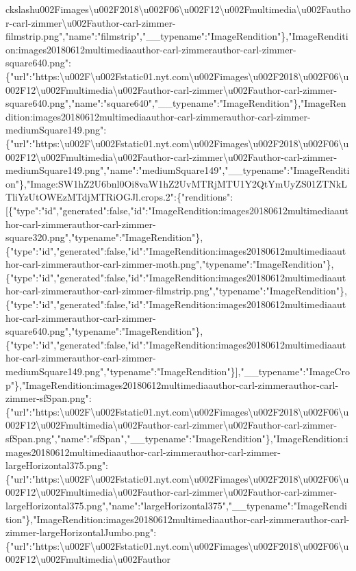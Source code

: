ckslash{}u002Fimages\textbackslash{}u002F2018\textbackslash{}u002F06\textbackslash{}u002F12\textbackslash{}u002Fmultimedia\textbackslash{}u002Fauthor-carl-zimmer\textbackslash{}u002Fauthor-carl-zimmer-filmstrip.png","name":"filmstrip","\_\_typename":"ImageRendition"\},"ImageRendition:images20180612multimediaauthor-carl-zimmerauthor-carl-zimmer-square640.png":\{"url":"https:\textbackslash{}u002F\textbackslash{}u002Fstatic01.nyt.com\textbackslash{}u002Fimages\textbackslash{}u002F2018\textbackslash{}u002F06\textbackslash{}u002F12\textbackslash{}u002Fmultimedia\textbackslash{}u002Fauthor-carl-zimmer\textbackslash{}u002Fauthor-carl-zimmer-square640.png","name":"square640","\_\_typename":"ImageRendition"\},"ImageRendition:images20180612multimediaauthor-carl-zimmerauthor-carl-zimmer-mediumSquare149.png":\{"url":"https:\textbackslash{}u002F\textbackslash{}u002Fstatic01.nyt.com\textbackslash{}u002Fimages\textbackslash{}u002F2018\textbackslash{}u002F06\textbackslash{}u002F12\textbackslash{}u002Fmultimedia\textbackslash{}u002Fauthor-carl-zimmer\textbackslash{}u002Fauthor-carl-zimmer-mediumSquare149.png","name":"mediumSquare149","\_\_typename":"ImageRendition"\},"Image:SW1hZ2U6bnl0Oi8vaW1hZ2UvMTRjMTU1Y2QtYmUyZS01ZTNkLTliYzUtOWEzMTdjMTRiOGJl.crops.2":\{"renditions":{[}\{"type":"id","generated":false,"id":"ImageRendition:images20180612multimediaauthor-carl-zimmerauthor-carl-zimmer-square320.png","typename":"ImageRendition"\},\{"type":"id","generated":false,"id":"ImageRendition:images20180612multimediaauthor-carl-zimmerauthor-carl-zimmer-moth.png","typename":"ImageRendition"\},\{"type":"id","generated":false,"id":"ImageRendition:images20180612multimediaauthor-carl-zimmerauthor-carl-zimmer-filmstrip.png","typename":"ImageRendition"\},\{"type":"id","generated":false,"id":"ImageRendition:images20180612multimediaauthor-carl-zimmerauthor-carl-zimmer-square640.png","typename":"ImageRendition"\},\{"type":"id","generated":false,"id":"ImageRendition:images20180612multimediaauthor-carl-zimmerauthor-carl-zimmer-mediumSquare149.png","typename":"ImageRendition"\}{]},"\_\_typename":"ImageCrop"\},"ImageRendition:images20180612multimediaauthor-carl-zimmerauthor-carl-zimmer-sfSpan.png":\{"url":"https:\textbackslash{}u002F\textbackslash{}u002Fstatic01.nyt.com\textbackslash{}u002Fimages\textbackslash{}u002F2018\textbackslash{}u002F06\textbackslash{}u002F12\textbackslash{}u002Fmultimedia\textbackslash{}u002Fauthor-carl-zimmer\textbackslash{}u002Fauthor-carl-zimmer-sfSpan.png","name":"sfSpan","\_\_typename":"ImageRendition"\},"ImageRendition:images20180612multimediaauthor-carl-zimmerauthor-carl-zimmer-largeHorizontal375.png":\{"url":"https:\textbackslash{}u002F\textbackslash{}u002Fstatic01.nyt.com\textbackslash{}u002Fimages\textbackslash{}u002F2018\textbackslash{}u002F06\textbackslash{}u002F12\textbackslash{}u002Fmultimedia\textbackslash{}u002Fauthor-carl-zimmer\textbackslash{}u002Fauthor-carl-zimmer-largeHorizontal375.png","name":"largeHorizontal375","\_\_typename":"ImageRendition"\},"ImageRendition:images20180612multimediaauthor-carl-zimmerauthor-carl-zimmer-largeHorizontalJumbo.png":\{"url":"https:\textbackslash{}u002F\textbackslash{}u002Fstatic01.nyt.com\textbackslash{}u002Fimages\textbackslash{}u002F2018\textbackslash{}u002F06\textbackslash{}u002F12\textbackslash{}u002Fmultimedia\textbackslash{}u002Fauthor